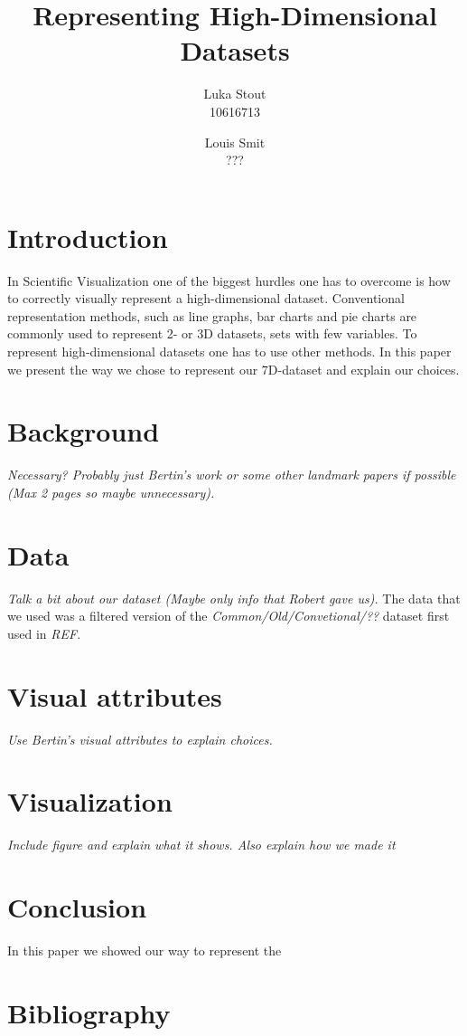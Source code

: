 \documentclass{article}
\title{Representing High-Dimensional Datasets}
\author{Luka Stout \\ 10616713  \and Louis Smit \\ ???}
\begin{document}
\maketitle

\section{Introduction}
In Scientific Visualization one of the biggest hurdles one has to overcome is how to correctly visually represent a high-dimensional dataset. Conventional representation methods, such as line graphs, bar charts and pie charts are commonly used to represent 2- or 3D 
datasets, sets with few variables. To represent high-dimensional datasets one has to use other methods. In this paper we present the way we chose to represent our 7D-dataset and explain our choices.

\section{Background}
\textit{Necessary? Probably just Bertin's work or some other landmark papers if possible (Max 2 pages so maybe unnecessary).}

\section{Data}
\textit{Talk a bit about our dataset (Maybe only info that Robert gave us).} The data that we used was a filtered version of the \textit{Common/Old/Convetional/??} dataset first used in \textit{REF}.

\section{Visual attributes}
\textit{Use Bertin's visual attributes to explain choices.}

\section{Visualization}
\textit{Include figure and explain what it shows. Also explain how we made it}

\section{Conclusion}
In this paper we showed our way to represent the 

\section{Bibliography}
\end{document}

